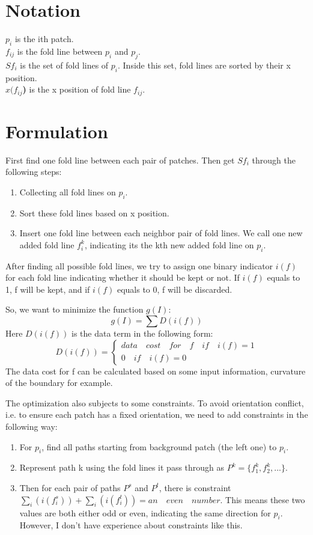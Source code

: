 \documentclass{article}
\begin{document}
\section{Notation}
\textbf{$p_i$} is the ith patch.\\
\textbf{$f_{ij}$} is the fold line between $p_i$ and $p_j$.\\
\textbf{$Sf_i$} is the set of fold lines of $p_i$. Inside this set, fold lines are sorted by their x position.\\
\textbf{$x(f_{ij}$)} is the x position of fold line $f_{ij}$.

\section{Formulation}
First find one fold line between each pair of patches. Then get $Sf_i$ through the following steps:
\begin{enumerate}
\item
  Collecting all fold lines on $p_i$.
\item
  Sort these fold lines based on x position.
\item
  Insert one fold line between each neighbor pair of fold lines. We call one new added fold line $f_i^k$, indicating its the kth new added fold line on $p_i$.
\end{enumerate}
After finding all possible fold lines, we try to assign one binary indicator $i(f)$ for each fold line indicating whether it should be kept or not. If $i(f)$ equals to 1, f will be kept, and if $i(f)$ equals to 0, f will be discarded.

So, we want to minimize the function $g(I)$:
\begin{equation}
  g(I) = \sum{D(i(f))}
\end{equation}
Here $D(i(f))$ is the data term in the following form:
\begin{equation}
  D(i(f)) = 
  \begin{cases}
    data \quad cost \quad for \quad f \quad if \quad i(f) = 1\\
    0 \quad if \quad i(f) = 0
  \end{cases}
\end{equation}
The data cost for f can be calculated based on some input information, curvature of the boundary for example.

\color{red}
The optimization also subjects to some constraints. To avoid orientation conflict, i.e. to ensure each patch has a fixed orientation, we need to add constraints in the following way:
\begin{enumerate}
\item
  For $p_i$, find all paths starting from background patch (the left one) to $p_i$.
\item
  Represent path k using the fold lines it pass through as $P^k = \{f_1^k, f_2^k, ...\}$.
\item
  Then for each pair of paths $P^s$ and $P^t$, there is constraint $\sum_i(i(f_i^s)) + \sum_i(i(f_i^t)) = an \quad even \quad number$. This means these two values are both either odd or even, indicating the same direction for $p_i$. However, I don't have experience about constraints like this.
\end{enumerate}
\color{black}
\end{document}
